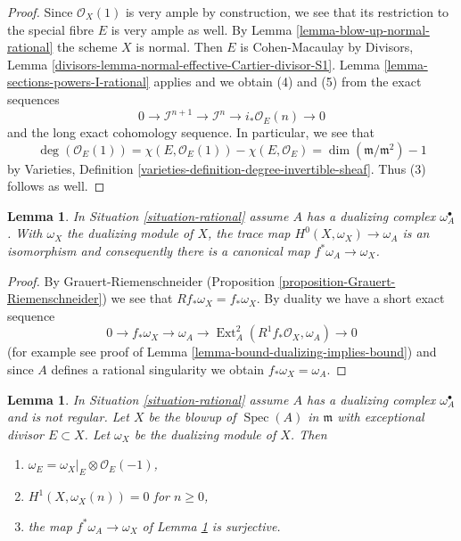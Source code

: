 \documentclass{stacks-project}
\theoremstyle{plain}
\newtheorem{lemma}[subsection]{Lemma}
\theoremstyle{definition}
\theoremstyle{remark}
\numberwithin{equation}{subsection}
\def\Spec{\mathop{\mathrm{Spec}}}
\def\Ext{\mathop{\mathrm{Ext}}\nolimits}
\begin{document}
\begin{proof}
Since $\mathcal{O}_X(1)$ is very ample by construction, we see that
its restriction to the special fibre $E$ is very ample as well.
By Lemma \ref{lemma-blow-up-normal-rational} the scheme $X$ is normal.
Then $E$ is Cohen-Macaulay by
Divisors, Lemma \ref{divisors-lemma-normal-effective-Cartier-divisor-S1}.
Lemma \ref{lemma-sections-powers-I-rational} applies and we obtain
(4) and (5) from the exact sequences
$$
0 \to \mathcal{I}^{n + 1} \to \mathcal{I}^n \to i_*\mathcal{O}_E(n) \to 0
$$
and the long exact cohomology sequence. In particular, we see that
$$
\deg(\mathcal{O}_E(1)) = \chi(E, \mathcal{O}_E(1)) - \chi(E, \mathcal{O}_E) =
\dim(\mathfrak m/\mathfrak m^2) - 1
$$
by Varieties, Definition \ref{varieties-definition-degree-invertible-sheaf}.
Thus (3) follows as well.
\end{proof}

\begin{lemma}
\label{lemma-dualizing-rational}
In Situation \ref{situation-rational} assume $A$ has a
dualizing complex $\omega_A^\bullet$. With $\omega_X$ the dualizing
module of $X$, the trace map $H^0(X, \omega_X) \to \omega_A$ is an
isomorphism and consequently there is a canonical map
$f^*\omega_A \to \omega_X$.
\end{lemma}

\begin{proof}
By Grauert-Riemenschneider
(Proposition \ref{proposition-Grauert-Riemenschneider}) we see that
$Rf_*\omega_X = f_*\omega_X$. By duality we have a short exact
sequence
$$
0 \to f_*\omega_X \to \omega_A \to
\Ext^2_A(R^1f_*\mathcal{O}_X, \omega_A) \to 0
$$
(for example see proof of Lemma \ref{lemma-bound-dualizing-implies-bound})
and since $A$ defines a rational singularity we obtain
$f_*\omega_X = \omega_A$.
\end{proof}

\begin{lemma}
\label{lemma-dualizing-blow-up-rational}
In Situation \ref{situation-rational} assume $A$ has a
dualizing complex $\omega_A^\bullet$ and is not regular.
Let $X$ be the blowup of $\Spec(A)$ in $\mathfrak m$ with
exceptional divisor $E \subset X$. Let $\omega_X$
be the dualizing module of $X$. Then
\begin{enumerate}
\item $\omega_E = \omega_X|_E \otimes \mathcal{O}_E(-1)$,
\item $H^1(X, \omega_X(n)) = 0$ for $n \geq 0$,
\item the map $f^*\omega_A \to \omega_X$ of
Lemma \ref{lemma-dualizing-rational} is surjective.
\end{enumerate}
\end{lemma}
\end{document}
